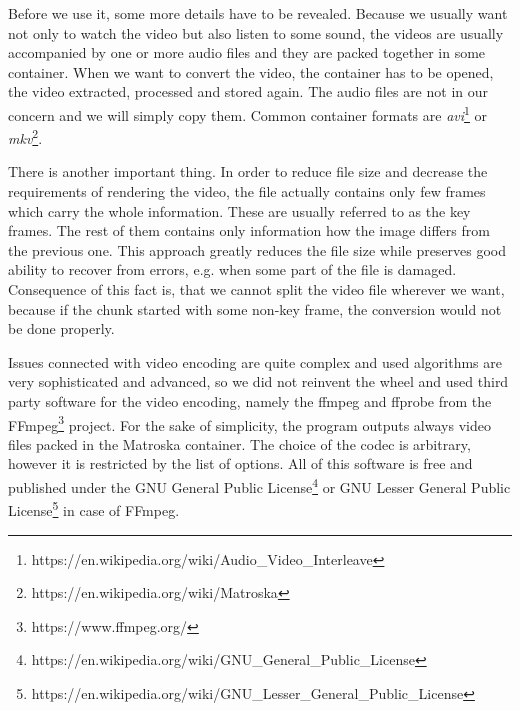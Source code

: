 Before we use it, some more details have to be revealed. Because we usually want not only to watch the video but also listen to some sound, the videos are usually accompanied by one or more audio files and they are packed together in some container. When we want to convert the video, the container has to be opened, the video extracted, processed and stored again. The audio files are not in our concern and we will simply copy them. Common container formats are \textit{avi}\footnote{https://en.wikipedia.org/wiki/Audio\_Video\_Interleave} or \textit{mkv}\footnote{https://en.wikipedia.org/wiki/Matroska}.

There is another important thing. In order to reduce file size and decrease the requirements of rendering the video, the file actually contains only few frames which carry the whole information. These are usually referred to as the key frames. The rest of them contains only information how the image differs from the previous one. This approach greatly reduces the file size while preserves good ability to recover from errors, e.g. when some part of the file is damaged. Consequence of this fact is, that we cannot split the video file wherever we want, because if the chunk started with some non-key frame, the conversion would not be done properly.

Issues connected with video encoding are quite complex and used algorithms are very sophisticated and advanced, so we did not reinvent the wheel and used third party software for the video encoding, namely the ffmpeg and ffprobe from the FFmpeg\footnote{https://www.ffmpeg.org/} project. For the sake of simplicity, the program outputs always video files packed in the Matroska container. The choice of the codec is arbitrary, however it is restricted by the list of options. All of this software is free and published under the GNU General Public License\footnote{https://en.wikipedia.org/wiki/GNU\_General\_Public\_License} or GNU Lesser General Public License\footnote{https://en.wikipedia.org/wiki/GNU\_Lesser\_General\_Public\_License} in case of FFmpeg.

